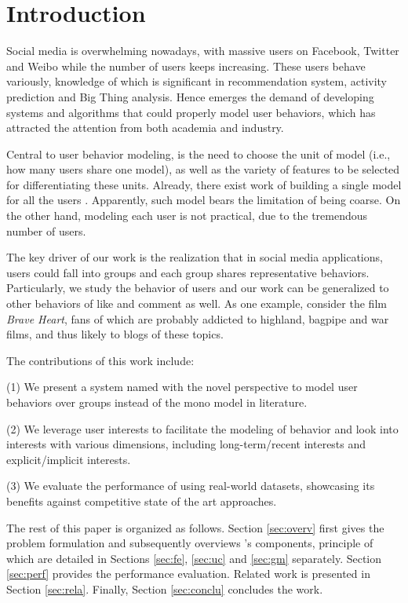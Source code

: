 \section{Introduction}
\label{sec:intro}

Social media is overwhelming nowadays, with massive users on Facebook, Twitter and Weibo while the number of users keeps increasing.
These users behave variously, knowledge of which is significant in recommendation system, activity prediction and Big Thing analysis.
Hence emerges the demand of developing systems and algorithms that could properly model user behaviors, which has attracted the attention from both academia and industry.

Central to user behavior modeling, is the need to choose the unit of model (i.e., how many users share one model), as well as the variety of features to be selected for differentiating these units.
Already, there exist work of building a single model for all the users .
Apparently, such model bears the limitation of being coarse.
On the other hand, modeling each user is not practical, due to the tremendous number of users.

The key driver of our work is the realization that in social media applications, users could fall into groups and each group shares representative behaviors.
Particularly, we study the \retg{} behavior of users and our work can be generalized to other behaviors of like and comment as well.
As one example, consider the film \textit{Brave Heart}, fans of which are probably addicted to highland, bagpipe and war films, and thus likely to \ret{} blogs of these topics.

  The contributions of this work include:

\stab(1) We present a system named \sys{} with the novel perspective to model user behaviors over groups instead of the mono model in literature.

\stab(2) We leverage user interests to facilitate the modeling of \retg{} behavior and look into interests with various dimensions, including long-term/recent interests and explicit/implicit interests.

\stab(3) We evaluate the performance of \sys{} using real-world datasets, showcasing its benefits against competitive state of the art approaches.



 The rest of this paper is organized as follows.
Section \ref{sec:overv} first gives the problem formulation and subsequently overviews \sys{}'s components, principle of which are detailed in Sections \ref{sec:fe}, \ref{sec:uc} and \ref{sec:gm} separately.
Section \ref{sec:perf} provides the performance evaluation.
Related work is presented in Section \ref{sec:rela}.
Finally, Section \ref{sec:conclu} concludes the work.











